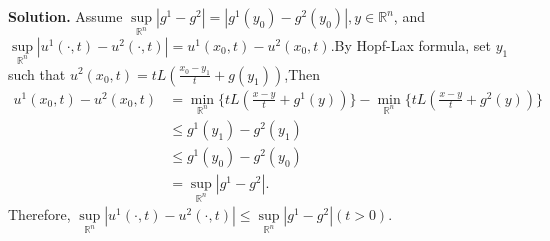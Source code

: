 \documentclass[a4paper]{book}
\newenvironment{solution}%
{\noindent\textbf{Solution.}}%
{\qedhere}
\numberwithin{equation}{chapter}
\theoremstyle{definition}
\begin{document}
\begin{solution}
  Assume $\sup\limits_{\mathbb{R}^n}\left| g^1 - g^2 \right| = \left| g^1(y_0) - g^2(y_0) \right|, y \in \mathbb{R}^n$, and $\sup\limits_{\mathbb{R}^n} \left| u^1(\cdot,t) - u^2(\cdot,t) \right| = u^1(x_0,t) - u^2(x_0,t)$.By Hopf-Lax formula, set $y_1$ such that $u^2(x_0,t) = tL(\frac{x_0 - y_1}{t} + g(y_1))$,Then
  \begin{align*}
    u^1(x_0,t) - u^2(x_0,t) &= \min\limits_{\mathbb{R}^n}\{tL(\frac{x - y}{t} + g^1(y))\} - \min\limits_{\mathbb{R}^n}\{tL(\frac{x - y}{t} + g^2(y))\} \\
                            &\leq g^1(y_1) - g^2(y_1) \\
                            &\leq g^1(y_0) - g^2(y_0) \\
                            &= \sup\limits_{\mathbb{R}^n}\left| g^1 - g^2 \right|.
  \end{align*}
  Therefore, $\sup\limits_{\mathbb{R}^n} \left| u^1(\cdot,t) - u^2(\cdot,t) \right| \leq \sup\limits_{\mathbb{R}^n}\left| g^1 - g^2 \right| (t > 0)$.
\end{solution}
















%   

%   

%   


\end{document}
